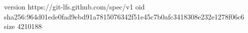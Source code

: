 version https://git-lfs.github.com/spec/v1
oid sha256:964d01ede0fad9ebd91a7815076342f51e45c7b0afc3418308e232e1278f06c6
size 4210188
